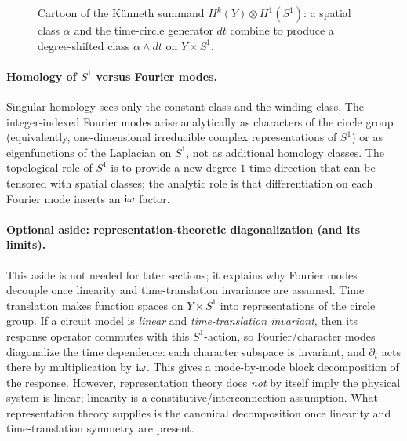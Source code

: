 \documentclass[11pt]{article}
\begin{document}
\begin{figure}[H]
\caption{Cartoon of the K\"unneth summand $H^k(Y)\otimes H^1(S^1)$: a spatial class $\alpha$ and the time-circle generator $dt$ combine to produce a degree-shifted class $\alpha\wedge dt$ on $Y\times S^1$.}
\label{fig:yxS1-cartoon}
\end{figure}

\paragraph{Homology of $S^1$ versus Fourier modes.}
Singular homology sees only the constant class and the winding class.
The integer-indexed Fourier modes arise analytically as characters of the circle group (equivalently, one-dimensional irreducible complex representations of $S^1$) or as eigenfunctions of the Laplacian on $S^1$, not as additional homology classes.
The topological role of $S^1$ is to provide a new degree-$1$ time direction that can be tensored with spatial classes; the analytic role is that differentiation on each Fourier mode inserts an $\mathrm{i}\omega$ factor.

\paragraph{Optional aside: representation-theoretic diagonalization (and its limits).}
This aside is not needed for later sections; it explains why Fourier modes decouple once linearity and time-translation invariance are assumed.
Time translation makes function spaces on $Y\times S^1$ into representations of the circle group.
If a circuit model is \emph{linear} and \emph{time-translation invariant}, then its response operator commutes with this $S^1$-action, so Fourier/character modes diagonalize the time dependence: each character subspace is invariant, and $\partial_t$ acts there by multiplication by $\mathrm{i}\omega$.
This gives a mode-by-mode block decomposition of the response.
However, representation theory does \emph{not} by itself imply the physical system is linear; linearity is a constitutive/interconnection assumption.
What representation theory supplies is the canonical decomposition once linearity and time-translation symmetry are present.
\end{document}
